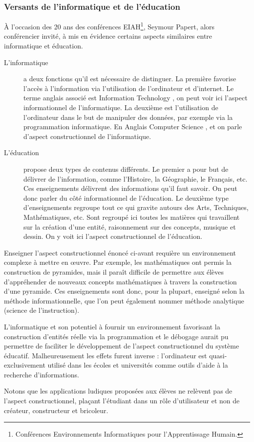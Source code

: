 \subsubsection{Versants de l'informatique et de l'éducation}
À l'occasion des 20 ans des conférences EIAH\footnote{Conférences Environnements Informatiques pour l'Apprentissage Humain.}, Seymour Papert, alors conférencier invité, à mis en évidence certains aspects similaires entre informatique et éducation.

\begin{description}
  \item[L'informatique] a deux fonctions qu'il est nécessaire de distinguer. La première favorise l'accès à l'information via l'utilisation de l'ordinateur et d'internet. Le terme anglais associé est \og Information Technology \fg{}, on peut voir ici l'aspect informationnel de l'informatique. La deuxième est l'utilisation de l'ordinateur dans le but de manipuler des données, par exemple via la programmation informatique. En Anglais \og Computer Science \fg{}, et on parle d'aspect constructionnel de l'informatique.
  \item[L'éducation] propose deux types de contenus différents. Le premier a pour but de délivrer de l'information, comme l'Histoire, la Géographie, le Français, etc. Ces enseignements délivrent des informations qu'il faut savoir. On peut donc parler du côté informationnel de l'éducation. Le deuxième type d'enseignements regroupe tout ce qui gravite autours des Arts, Techniques, Mathématiques, etc. Sont regroupé ici toutes les matières qui travaillent sur la création d'une entité, raisonnement sur des concepts, musique et dessin. On y voit ici l'aspect constructionnel de l'éducation.
\end{description}

Enseigner l'aspect constructionnel énoncé ci-avant requière un environnement complexe à mettre en œuvre. Par exemple, les mathématiques ont permis la construction de pyramides, mais il paraît difficile de permettre aux élèves d’appréhender de nouveaux concepts mathématiques à travers la construction d'une pyramide. Ces enseignements sont donc, pour la plupart, enseigné selon la méthode informationnelle, que l'on peut également nommer méthode analytique (science de l'instruction).

L'informatique et son potentiel à fournir un environnement favorisant la construction d'entités réelle via la programmation et le débogage aurait pu permettre de faciliter le développement de l'aspect constructionnel du système éducatif. Malheureusement les effets furent inverse : l'ordinateur est quasi-exclusivement utilisé dans les écoles et universités comme outils d'aide à la recherche d'informations.

Notons que les applications \og ludiques \fg{} proposées aux élèves ne relèvent pas de l'aspect constructionnel, plaçant l'étudiant dans un rôle d'utilisateur et non de créateur, constructeur et bricoleur.